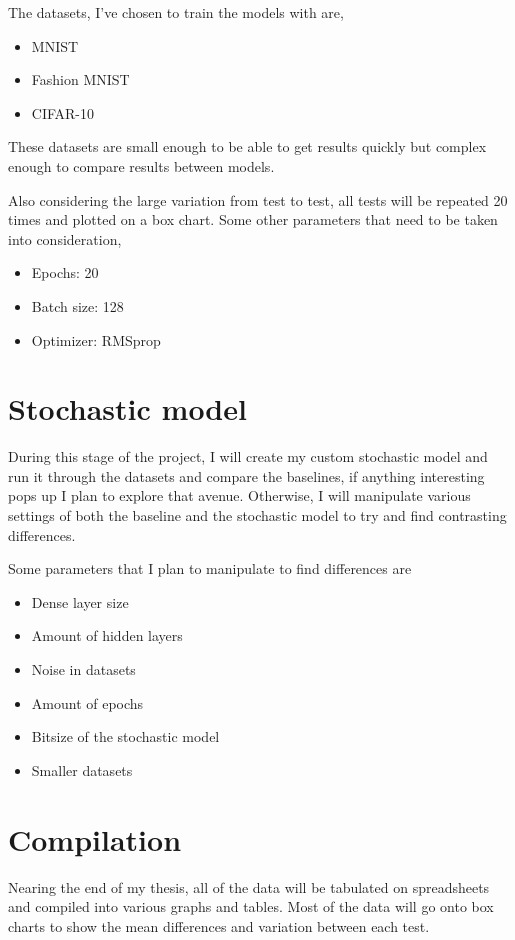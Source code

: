 \documentclass[a4paper,oneside,phd,etd]{BYUPhys}
\begin{document}
The datasets, I've chosen to train the models with are, 
\begin{itemize}
    \itemsep0em
    \item MNIST
    \item Fashion MNIST
    \item CIFAR-10
\end{itemize}
These datasets are small enough to be able to get results quickly but complex enough to compare results between models.

Also considering the large variation from test to test, all tests will be repeated 20 times and plotted on a box chart.
Some other parameters that need to be taken into consideration,
\begin{itemize}
    \itemsep0em
    \item Epochs: 20
    \item Batch size: 128
    \item Optimizer: RMSprop
\end{itemize}

\section{Stochastic model}
During this stage of the project, I will create my custom stochastic model and run it through the datasets and compare the baselines, if anything interesting pops up I plan to explore that avenue. Otherwise, I will manipulate various settings of both the baseline and the stochastic model to try and find contrasting differences.

Some parameters that I plan to manipulate to find differences are
\begin{itemize}
    \itemsep0em
    \item Dense layer size
    \item Amount of hidden layers
    \item Noise in datasets
    \item Amount of epochs
    \item Bitsize of the stochastic model
    \item Smaller datasets
\end{itemize}

\section{Compilation}
Nearing the end of my thesis, all of the data will be tabulated on spreadsheets and compiled into various graphs and tables. Most of the data will go onto box charts to show the mean differences and variation between each test.
\end{document}
